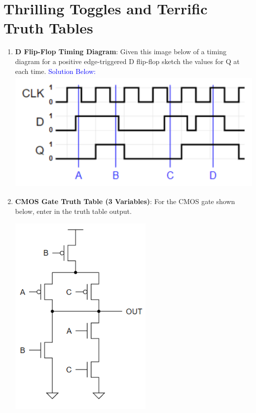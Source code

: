 \documentclass{article}
\begin{document}
\section{Thrilling Toggles and Terrific Truth Tables}
\begin{enumerate}[label=(\alph*)]
    \item
        \textbf{D Flip-Flop Timing Diagram}: Given this image below of a timing diagram for a positive edge-triggered D flip-flop sketch the values for Q at each time. \textcolor{blue}{Solution Below:}
        \newline
        \includegraphics[width=15cm,height=6cm]{figures/DFlipFlopSolutions.png}
    \item 
        \textbf{CMOS Gate Truth Table (3 Variables)}: For the CMOS gate shown below, enter in the truth table output.
        \begin{multicols}{2}
        \includegraphics[width=7cm]{figures/CMOS.png}
        \columnbreak
        \begin{center}
        \scalebox{1.8} {
        \begin{tabular}{||c c c c||}

\end{tabular}}
\end{center}
\end{multicols}
\end{enumerate}
\end{document}
